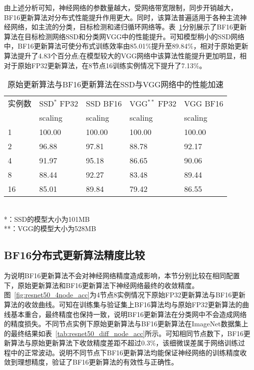 由上述分析可知，神经网络的参数量越大，受网络带宽限制，同步开销越大，BF16更新算法对分布式性能提升作用更大。同时，该算法普遍适用于各种主流神经网络，如主流的分类，目标检测和递归循环网络等。表~\ref{tab:ssd_vgg_scaling}分别展示了BF16更新算法在目标检测网络SSD和分类网VGG中的性能提升。可知模型稍小的SSD网络中，BF16更新算法可使分布式训练效率由85.01\%提升至89.84\%，相对于原始更新算法提升了4.83个百分点;在模型较大的VGG网络中该算法性能提升更加明显，相对于原始FP32更新算法，在8节点16训练实例情况下提升了7.13\%。
\begin{table}[htbp]
  \centering
  \caption{原始更新算法与BF16更新算法在SSD与VGG网络中的性能加速}
  \label{tab:ssd_vgg_scaling}
  \begin{minipage}[t]{0.8\textwidth} 
    \begin{tabularx}{\linewidth}{|l|X|X|X|X|}
      \hline
      实例数 & SSD$^{*}$ FP32 & SSD BF16 & VGG$^{**}$ FP32 & VGG BF16 \\
       & scaling & scaling & scaling & scaling\\
      \hline
1 & 100.00 & 100.00 & 100.00 & 100.00 \\
2 & 96.88 & 97.81 & 88.78 & 92.17 \\
4 & 91.97 & 95.18 & 86.65 & 90.06 \\
8 & 88.44 & 92.27 & 83.48 & 89.44 \\
16 & 85.01 & 89.84 & 79.42 & 86.55 \\
      \hline
    \end{tabularx}\\[2pt]
    \footnotesize
    *：SSD的模型大小为101MB\\
    **：VGG的模型大小为528MB
  \end{minipage}
\end{table}

\subsection{BF16分布式更新算法精度比较}
为说明BF16更新算法不会对神经网络精度造成影响，本节分别比较在相同配置下，原始更新算法和BF16更新算法下神经网络最终的收敛精度。图~\ref{fig:resnet50_4node_acc}为4节点8实例情况下原始FP32更新算法与BF16更新算法的收敛曲线。可知在训练集与验证集上BF16算法均与原始FP32更新算法的曲线基本重合，最终精度也保持一致，说明BF16更新算法在分类网中不会造成网络的精度损失。不同节点实例下原始更新算法与BF16更新算法在ImageNet数据集上的最终结果如表~\ref{tab:resnet50_diff_node_acc}所示。可知相同节点数下，BF16更新算法与原始更新算法下收敛精度差距不超过0.3\%，该细微误差属于网络训练过程中的正常波动。说明不同节点下BF16更新算法均能保证神经网络的训练精度收敛到理想精度，验证了BF16更新算法的有效性与正确性。 

